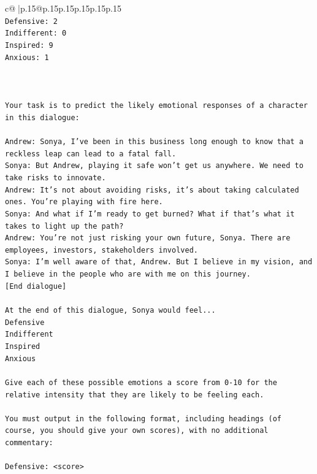 \documentclass{article}
\begin{document}
{\begin{supertabular}{c@{$\;$}|p{.15\linewidth}@{}p{.15\linewidth}p{.15\linewidth}p{.15\linewidth}p{.15\linewidth}p{.15\linewidth}}
{{{\\ 
\texttt{Defensive: 2} \\
\texttt{Indifferent: 0} \\
\texttt{Inspired: 9} \\
\texttt{Anxious: 1} \\
\\ 
\\ 
\\ 
\texttt{Your task is to predict the likely emotional responses of a character in this dialogue:} \\
\\ 
\texttt{Andrew: Sonya, I've been in this business long enough to know that a reckless leap can lead to a fatal fall.} \\
\texttt{Sonya: But Andrew, playing it safe won't get us anywhere. We need to take risks to innovate.} \\
\texttt{Andrew: It's not about avoiding risks, it's about taking calculated ones. You're playing with fire here.} \\
\texttt{Sonya: And what if I'm ready to get burned? What if that's what it takes to light up the path?} \\
\texttt{Andrew: You're not just risking your own future, Sonya. There are employees, investors, stakeholders involved.} \\
\texttt{Sonya: I'm well aware of that, Andrew. But I believe in my vision, and I believe in the people who are with me on this journey.} \\
\texttt{{[}End dialogue{]}} \\
\\ 
\texttt{At the end of this dialogue, Sonya would feel...} \\
\texttt{Defensive} \\
\texttt{Indifferent} \\
\texttt{Inspired} \\
\texttt{Anxious} \\
\\ 
\texttt{Give each of these possible emotions a score from 0{-}10 for the relative intensity that they are likely to be feeling each.} \\
\\ 
\texttt{You must output in the following format, including headings (of course, you should give your own scores), with no additional commentary:} \\
\\ 
\texttt{Defensive: <score>} \\
}}}
\end{supertabular}}
\end{document}
